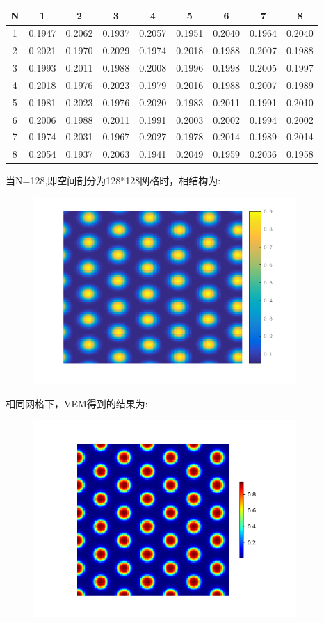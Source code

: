\documentclass[12pt]{article}
\begin{document}
\begin{CJK}{UTF8}{gkai}
\begin{table}[H]
\begin{tabular}{ccccccccc}
    		\toprule
    		N&1& 2  &3&4&5&6&7&8\\
    		\midrule    
    		1&0.1947&	0.2062&	0.1937&	0.2057&	0.1951&	0.2040&	0.1964&	0.2040\\
    		2&0.2021&	0.1970&	0.2029&	0.1974&	0.2018&	0.1988&	0.2007&	0.1988\\
    		3&0.1993&	0.2011&	0.1988&	0.2008&	0.1996&	0.1998&	0.2005&	0.1997\\
    		4&0.2018&	0.1976&	0.2023&	0.1979&	0.2016&	0.1988&	0.2007&	0.1989\\
    		5&0.1981&	0.2023&	0.1976&	0.2020&	0.1983&	0.2011&	0.1991&	0.2010\\
    		6&0.2006&	0.1988&	0.2011&	0.1991&	0.2003&	0.2002&	0.1994&	0.2002\\
    		7&0.1974&	0.2031&	0.1967 &	0.2027&	0.1978&	0.2014&	0.1989&	0.2014\\
    		8&0.2054&	0.1937&	0.2063&	0.1941&	0.2049&	0.1959&	0.2036&	0.1958\\
    		\bottomrule
    	\end{tabular}
    \end{table} 
    当N=128,即空间剖分为128*128网格时，相结构为:\\
    \begin{figure}[H] 
    	\centering
    	\includegraphics[width=10cm]{p.png}
    \end{figure}
    相同网格下，VEM得到的结果为:\\
    \begin{figure}[H] 
    	\centering
    	\includegraphics[width=10cm]{scftfigure5770.png}
    \end{figure}         
     

\end{CJK}
\end{document}
